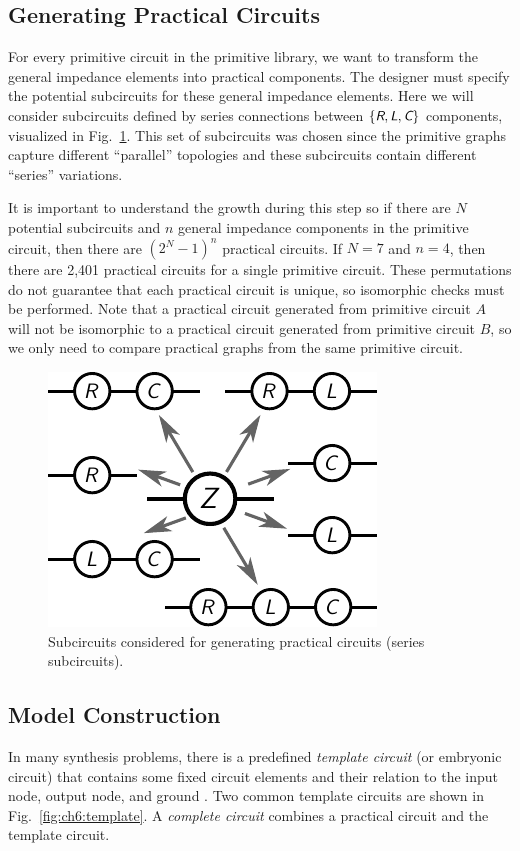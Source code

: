 \subsection{Generating Practical Circuits}

For every primitive circuit in the primitive library, we want to transform the general impedance elements into practical components.
The designer must specify the potential subcircuits for these general impedance elements. Here we will consider subcircuits defined by series connections between $\{\textsl{\textsf{R}}, \textsl{\textsf{L}}, \textsl{\textsf{C}}\}$ components, visualized in Fig.~\ref{fig:ch6:subcircuits}.
This set of subcircuits was chosen since the primitive graphs capture different ``parallel'' topologies and these subcircuits contain different ``series'' variations.

It is important to understand the growth during this step so if there are $N$ potential subcircuits and $n$ general impedance components in the primitive circuit, then there are $(2^N - 1)^n$ practical circuits. If $N = 7$ and $n=4$, then there are 2,401 practical circuits for a single primitive circuit.
These permutations do not guarantee that each practical circuit is unique, so isomorphic checks must be performed.
Note that a practical circuit generated from primitive circuit $A$ will not be isomorphic to a practical circuit generated from primitive circuit $B$, so we only need to compare practical graphs from the same primitive circuit.
 
\begin{figure}
\centering
\includegraphics[width=0.3\columnwidth]{../ch6/figures/subcircuits.pdf}
\caption{Subcircuits considered for generating practical circuits (series  subcircuits).\label{fig:ch6:subcircuits}}
\end{figure}

\subsection{Model Construction}

In many synthesis problems, there is a predefined \textit{template circuit} (or embryonic circuit) that contains some fixed circuit elements and their relation to the input node, output node, and ground \cite{Das2007a, Gan2010a, Goh2001a, Koza1997a, Lohn1999a}.
Two common template circuits are shown in Fig.~\ref{fig:ch6:template}.
A \textit{complete circuit} combines a practical circuit and the template circuit.

